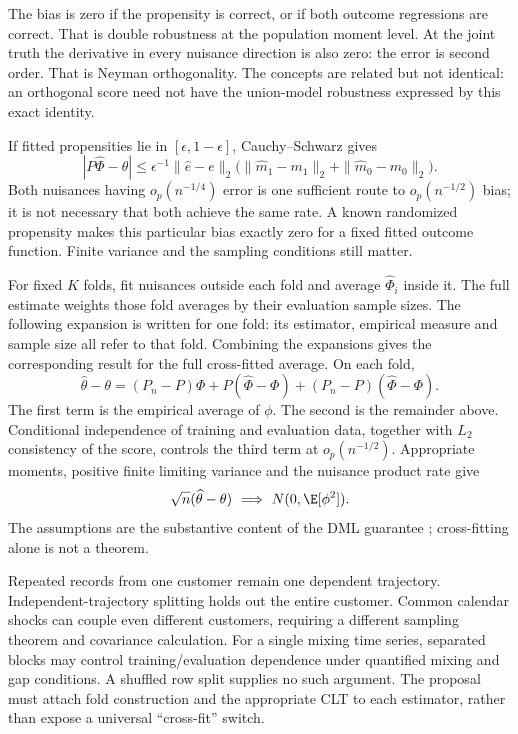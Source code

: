 The bias is zero if the propensity is correct, or if both outcome
regressions are correct. That is double robustness at the population
moment level. At the joint truth the derivative in every nuisance
direction is also zero: the error is second order. That is Neyman
orthogonality. The concepts are related but not identical: an orthogonal
score need not have the union-model robustness expressed by this exact
identity.

If fitted propensities lie in $[\epsilon,1-\epsilon]$,
Cauchy--Schwarz gives
\[
 |P\widehat\Phi-\theta|
 \le\epsilon^{-1}\|\widehat e-e\|_2
       \bigl(\|\widehat m_1-m_1\|_2+
             \|\widehat m_0-m_0\|_2\bigr).
\]
Both nuisances having $o_p(n^{-1/4})$ error is one sufficient route to
$o_p(n^{-1/2})$ bias; it is not necessary that both achieve the same
rate. A known randomized propensity makes this particular bias exactly
zero for a fixed fitted outcome function. Finite variance and the
sampling conditions still matter.

For fixed $K$ folds, fit nuisances outside each fold and average
$\widehat\Phi_i$ inside it. The full estimate weights those fold
averages by their evaluation sample sizes. The following expansion
is written for one fold: its estimator, empirical measure and sample
size all refer to that fold. Combining the expansions gives the
corresponding result for the full cross-fitted average. On each fold,
\[
 \widehat\theta-\theta
 =(P_n-P)\Phi+P(\widehat\Phi-\Phi)
                  +(P_n-P)(\widehat\Phi-\Phi).
\]
The first term is the empirical average of $\phi$. The second is the
remainder above. Conditional independence of training and evaluation
data, together with $L_2$ consistency of the score, controls the third
term at $o_p(n^{-1/2})$. Appropriate moments, positive finite limiting
variance and the nuisance product rate give
\[
 \sqrt n(\widehat\theta-\theta)\ \Longrightarrow\
 N(0,\E[\phi^2]).
\]
The assumptions are the substantive content of the DML guarantee
\citep[Assumption 5.1 and Theorem 5.1]{dml2018}; cross-fitting alone
is not a theorem.

Repeated records from one customer remain one dependent trajectory.
Independent-trajectory splitting holds out the entire customer. Common
calendar shocks can couple even different customers, requiring a different
sampling theorem and covariance calculation. For a single mixing time
series, separated blocks may control training/evaluation dependence under
quantified mixing and gap conditions. A shuffled row split supplies no
such argument. The proposal must attach fold construction and the
appropriate CLT to each estimator, rather than expose a universal
``cross-fit'' switch.

